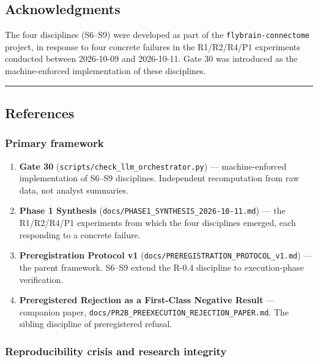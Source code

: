 \documentclass[
]{article}
\begin{document}
\subsection{Acknowledgments}\label{acknowledgments}

The four disciplines (S6--S9) were developed as part of the
\texttt{flybrain-connectome} project, in response to four concrete
failures in the R1/R2/R4/P1 experiments conducted between 2026-10-09 and
2026-10-11. Gate 30 was introduced as the machine-enforced
implementation of these disciplines.

\begin{center}\rule{0.5\linewidth}{0.5pt}\end{center}

\subsection{References}\label{references}

\subsubsection{Primary framework}\label{primary-framework}

\begin{enumerate}
\def\labelenumi{\arabic{enumi}.}
\item
  \textbf{Gate 30} (\texttt{scripts/check\_llm\_orchestrator.py}) ---
  machine-enforced implementation of S6--S9 disciplines. Independent
  recomputation from raw data, not analyst summaries.
\item
  \textbf{Phase 1 Synthesis}
  (\texttt{docs/PHASE1\_SYNTHESIS\_2026-10-11.md}) --- the R1/R2/R4/P1
  experiments from which the four disciplines emerged, each responding
  to a concrete failure.
\item
  \textbf{Preregistration Protocol v1}
  (\texttt{docs/PREREGISTRATION\_PROTOCOL\_v1.md}) --- the parent
  framework. S6--S9 extend the R-0.4 discipline to execution-phase
  verification.
\item
  \textbf{Preregistered Rejection as a First-Class Negative Result} ---
  companion paper,
  \texttt{docs/PR2B\_PREEXECUTION\_REJECTION\_PAPER.md}. The sibling
  discipline of preregistered refusal.
\end{enumerate}

\subsubsection{Reproducibility crisis and research
integrity}\label{reproducibility-crisis-and-research-integrity}
\end{document}
